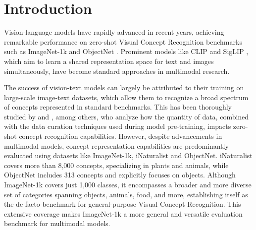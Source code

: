 \documentclass[11pt]{article}
\begin{document}
\section{Introduction}

Vision-language models have rapidly advanced in recent years, achieving remarkable performance on zero-shot Visual Concept Recognition benchmarks such as ImageNet-1k \citep{deng2009imagenet} and ObjectNet \citep{barbu2019objectnet}. 
Prominent models like CLIP \citep{radford2021learning} and SigLIP \citep{zhai2023sigmoid}, which aim to learn a shared representation space for text and images simultaneously, have become standard approaches in multimodal research.

The success of vision-text models can largely be attributed to their training on large-scale image-text datasets, which allow them to recognize a broad spectrum of concepts represented in standard benchmarks. 
This has been thoroughly studied by \citet{laion-5b} and \citet{gadre2024datacomp}, among others, who analyze how the quantity of data, combined with the data curation techniques used during model pre-training, impacts zero-shot concept recognition capabilities.
However, despite advancements in multimodal models, concept representation capabilities are predominantly evaluated using datasets like ImageNet-1k, iNaturalist \citep{van2018inaturalist} and ObjectNet.
iNaturalist covers more than 8,000 concepts, specializing in plants and animals, while ObjectNet includes 313 concepts and explicitly focuses on objects.
Although ImageNet-1k covers just 1,000 classes, it encompasses a broader and more diverse set of categories spanning objects, animals, food, and more, establishing itself as the de facto benchmark for general-purpose Visual Concept Recognition.
This extensive coverage makes ImageNet-1k a more general and versatile evaluation benchmark for multimodal models. 
\end{document}
